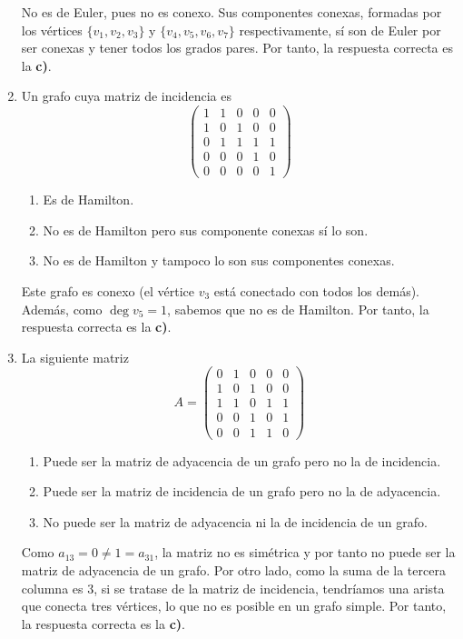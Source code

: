 \begin{ejercicio}
\begin{enumerate}
        No es de Euler, pues no es conexo. Sus componentes conexas, formadas por los vértices $\{v_1,v_2,v_3\}$ y $\{v_4,v_5,v_6,v_7\}$ respectivamente, sí son de Euler por ser conexas y tener todos los grados pares. Por tanto, la respuesta correcta es la \textbf{c)}.
        \item Un grafo cuya matriz de incidencia es
        \[
            \begin{pmatrix}
                1 & 1 & 0 & 0 & 0 \\
                1 & 0 & 1 & 0 & 0 \\
                0 & 1 & 1 & 1 & 1 \\
                0 & 0 & 0 & 1 & 0 \\
                0 & 0 & 0 & 0 & 1
            \end{pmatrix}
        \]
        \begin{enumerate}
            \item Es de Hamilton.
            \item No es de Hamilton pero sus componente conexas sí lo son.
            \item No es de Hamilton y tampoco lo son sus componentes conexas.
        \end{enumerate}

        Este grafo es conexo (el vértice $v_3$ está conectado con todos los demás). Además, como $\deg v_5=1$, sabemos que no es de Hamilton. Por tanto, la respuesta correcta es la \textbf{c)}.
        \item La siguiente matriz
        \[
            A=\begin{pmatrix}
                0 & 1 & 0 & 0 & 0 \\
                1 & 0 & 1 & 0 & 0 \\
                1 & 1 & 0 & 1 & 1 \\
                0 & 0 & 1 & 0 & 1 \\
                0 & 0 & 1 & 1 & 0
            \end{pmatrix}
        \]
        \begin{enumerate}
            \item Puede ser la matriz de adyacencia de un grafo pero no la de incidencia.
            \item Puede ser la matriz de incidencia de un grafo pero no la de adyacencia.
            \item No puede ser la matriz de adyacencia ni la de incidencia de un grafo.
        \end{enumerate}

        Como $a_{13}=0\neq 1=a_{31}$, la matriz no es simétrica y por tanto no puede ser la matriz de adyacencia de un grafo. Por otro lado, como la suma de la tercera columna es $3$, si se tratase de la matriz de incidencia, tendríamos una arista que conecta tres vértices, lo que no es posible en un grafo simple. Por tanto, la respuesta correcta es la \textbf{c)}.
    \end{enumerate}
\end{ejercicio}

